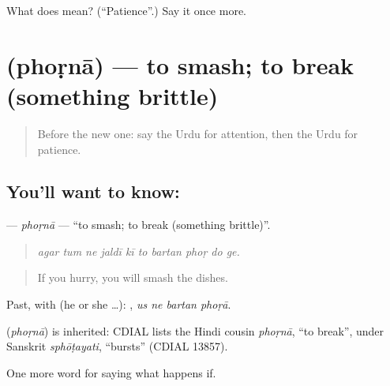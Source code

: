 \begin{tcolorbox}[breakable,colback=teal!4,colframe=teal!35!black,title={Before you move on}]
What does  mean? (\textquotedblleft{}Patience\textquotedblright{}.) Say it once more.
\end{tcolorbox}
\section[\texorpdfstring{\ur{پھوڑنا} (phoṛnā)}{پھوڑنا (phoṛnā)}]{ (phoṛnā) — to smash; to break (something brittle)}

\label{lesson:UR-C370-phorna}



\begin{quote}
Before the new one: say the Urdu for attention, then the Urdu for patience.
\end{quote}

\subsection*{You'll want to know: }
\textbf{} — \emph{phoṛnā} — \textquotedblleft{}to smash; to break (something brittle)\textquotedblright{}.

\begin{quote}
         
\end{quote}

\begin{quote}
\emph{agar tum ne jaldī kī to bartan phoṛ do ge.}
\end{quote}

\begin{quote}
If you hurry, you will smash the dishes.
\end{quote}

Past, with  (he or she …):    , \emph{us ne bartan phoṛā}.

\begin{cousinweb}
\textbf{} (\emph{phoṛnā}) is inherited: CDIAL lists the Hindi cousin \emph{phoṛnā}, \textquotedblleft{}to break\textquotedblright{}, under Sanskrit \emph{sphōṭayati}, \textquotedblleft{}bursts\textquotedblright{} (CDIAL 13857).
\end{cousinweb}

\begin{grammarlens}[title={What you've built}]
One more word for saying what happens if.
\end{grammarlens}

